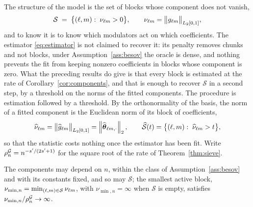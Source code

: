 The structure of the model is the set of blocks whose component does not
vanish,
\[
  \mathcal{S} \;=\; \bigl\{(\ell,m) :\; \nu_{\ell m} > 0\bigr\},
  \qquad
  \nu_{\ell m} = \bigl\lVert g_{\ell m} \bigr\rVert_{L_2[0,1]},
\]
and to know it is to know which modulators act on which coefficients. The
 estimator \eqref{eq:estimator} is not claimed to recover it: its
penalty removes chunks and not blocks, under Assumption~\ref{ass:besov} the
oracle is dense, and nothing prevents the fit from keeping nonzero
coefficients in blocks whose component is zero. What the preceding results do give is that every block is
estimated at the rate of Corollary~\ref{cor:components}, and that is enough to
recover $\mathcal{S}$ in a second step, by a threshold on the norms of the fitted
components. The procedure is estimation followed by a threshold. By the
orthonormality of the basis, the norm of a fitted component is the Euclidean
norm of its block of coefficients,
\[
  \widehat{\nu}_{\ell m}
  = \bigl\lVert \widehat{g}_{\ell m} \bigr\rVert_{L_2[0,1]}
  = \left\lVert \widehat{\boldsymbol{\theta}}_{\ell m,\cdot} \right\rVert_{2},
  \qquad
  \widehat{\mathcal{S}}(t) = \bigl\{(\ell,m) :\; \widehat{\nu}_{\ell m} > t\bigr\},
\]
so that the statistic costs nothing once the estimator has been fit. Write
 $\rho^{\mathcal{G}}_{n} = n^{-s'/(2s'+1)}$ for the square root of the rate of
Theorem~\ref{thm:sieve}.

\begin{assumption}
\label{ass:sep}
The components may depend on $n$, within the class of
Assumption~\ref{ass:besov} and with its constants fixed, and so may $\mathcal{S}$; the
smallest active block, $\nu_{\min,n} = \min_{(\ell,m)\in \mathcal{S}} \nu_{\ell m}$, with
$\nu_{\min,n} = \infty$ when $\mathcal{S}$ is empty, satisfies  $\nu_{\min,n}/\rho^{\mathcal{G}}_{n} \to \infty$.
\end{assumption}


